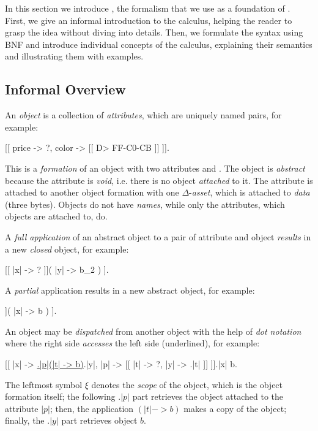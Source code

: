 
In this section we introduce \phic{}, the formalism that we use as a foundation of \eolang{}.
First, we give an informal introduction to the calculus, helping the reader to grasp the idea without diving into details.
Then, we formulate the syntax using BNF and introduce individual concepts of the calculus, explaining their semantics and illustrating them with examples.

\subsection{Informal Overview}

An \emph{object} is a collection of \emph{attributes}, which are uniquely named pairs, for example:
\begin{phiquation}
\label{eq:price-color}
[[ price -> ?, color -> [[ D> FF-C0-CB ]] ]].
\end{phiquation}
This is a \emph{formation} of an object with two attributes  and .
The object is \emph{abstract} because the  attribute is \emph{void}, i.e. there is no object \emph{attached} to it.
The  attribute is attached to another object formation with one \(\Delta\)-\emph{asset}, which is attached to \emph{data} (three bytes).
Objects do not have \emph{names}, while only the attributes, which objects are attached to, do.

A \emph{full application} of an abstract object to a pair of attribute and object \emph{results} in a new \emph{closed} object, for example:
\begin{phiquation}
\label{eq:simple-application}
[[ |x| -> ? ]]( |y| -> b_2 ) \trans [[ |x| -> b_2 ]].
\end{phiquation}
A \emph{partial} application results in a new abstract object, for example:
\begin{phiquation*}
[[ |x| -> ?, |y| -> ? ]]( |x| -> b ) \trans [[ |x| -> b, |y| -> ? ]].
\end{phiquation*}

An object may be \emph{dispatched} from another object with the help of \emph{dot notation} where the right side \emph{accesses} the left side (underlined), for example:
\begin{phiquation}
\label{eq:dot-notation}
[[ |x| -> \underline{\xi.|p|(|t| -> b)}.|y|, |p| -> [[ |t| -> ?, |y| -> \xi.|t| ]] ]].|x| \trans b.
\end{phiquation}
The leftmost symbol \(\xi\) denotes the \emph{scope} of the object,
which is the object formation itself; the following \(.|p|\) part
retrieves the object attached to the attribute \(|p|\);
then, the application $(|t|->b)$ makes a copy of the object;
finally, the \(.|y|\) part retrieves object \(b\).


